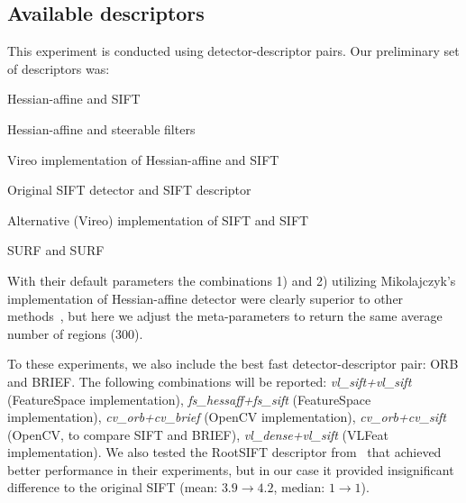 \documentclass[10pt,journal,cspaper,compsoc]{IEEEtran}
\begin{document}


%
\subsection{Available descriptors}
%
This experiment is conducted using detector-descriptor
pairs. Our preliminary set of descriptors was:
\begin{compactenum}
\item Hessian-affine and SIFT
\item Hessian-affine and steerable filters
\item Vireo implementation of Hessian-affine and SIFT
\item Original SIFT detector and SIFT descriptor
\item Alternative (Vireo) implementation of SIFT and SIFT
\item SURF and SURF
\end{compactenum}
With their default parameters the combinations 1) and 2) utilizing
Mikolajczyk's implementation of Hessian-affine detector were
clearly superior to other methods~\cite{LanKanKam:2012}, but here
we adjust the meta-parameters to
return the same average number of regions (300).

To these experiments, we also include the best fast detector-descriptor
pair: ORB and BRIEF.
The following combinations will be reported:
{\em vl\_sift+vl\_sift} (FeatureSpace implementation),
{\em fs\_hessaff+fs\_sift} (FeatureSpace implementation),
{\em cv\_orb+cv\_brief} (OpenCV implementation),
{\em cv\_orb+cv\_sift} (OpenCV, to compare SIFT and BRIEF),
{\em vl\_dense+vl\_sift} (VLFeat implementation).
%
We also tested the RootSIFT descriptor
from~\cite{AraZis:2012} that achieved better performance in
their experiments, but in our case it
provided insignificant difference to the original SIFT
(mean: $3.9 \rightarrow 4.2$, median: $1 \rightarrow 1$). 
\end{document}
